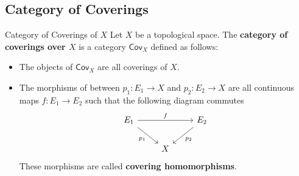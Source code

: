 \documentclass{report}
\begin{document}
\subsection{Category of Coverings}

\begin{definition}{Category of Coverings of $X$}{}
	Let $X$ be a topological space. The \textbf{category of coverings over $X$} is a category $\mathsf{Cov}_X$ defined as follows:
	\begin{itemize}
		\item The objects of $\mathsf{Cov}_X$ are all coverings of $X$.
		\item The morphisms of between $p_1:E_1\to X$ and $p_2:E_2\to X$ are all continuous maps $f:E_1\to E_2$ such that the following diagram commutes
		      \begin{equation*}
			      \begin{tikzcd}[ampersand replacement=\&]
				      E_1 \arrow[rr, "f"] \arrow[rd, "p_1"'] \& \& E_2 \arrow[ld, "p_2"] \\
				      \& X \&
			      \end{tikzcd}
		      \end{equation*}
		These morphisms are called \textbf{covering homomorphisms}.
	\end{itemize}
\end{definition}
\end{document}
